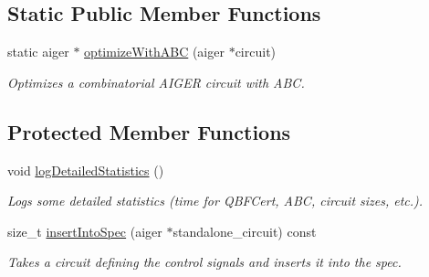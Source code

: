 \subsection*{Static Public Member Functions}
\begin{DoxyCompactItemize}
\item 
static aiger $\ast$ \hyperlink{classCNFImplExtractor_ad21828d816dfdbf672f6e595589ef6e7}{optimize\-With\-A\-B\-C} (aiger $\ast$circuit)
\begin{DoxyCompactList}\small\item\em Optimizes a combinatorial A\-I\-G\-E\-R circuit with A\-B\-C. \end{DoxyCompactList}\end{DoxyCompactItemize}
\subsection*{Protected Member Functions}
\begin{DoxyCompactItemize}
\item 
void \hyperlink{classQBFCertImplExtractor_aa6a292ba4108e707f458c04d621a6d9e}{log\-Detailed\-Statistics} ()
\begin{DoxyCompactList}\small\item\em Logs some detailed statistics (time for Q\-B\-F\-Cert, A\-B\-C, circuit sizes, etc.). \end{DoxyCompactList}\item 
size\-\_\-t \hyperlink{classCNFImplExtractor_a0970602635f3356712d57ebb28d12c0d}{insert\-Into\-Spec} (aiger $\ast$standalone\-\_\-circuit) const 
\begin{DoxyCompactList}\small\item\em Takes a circuit defining the control signals and inserts it into the spec. \end{DoxyCompactList}\end{DoxyCompactItemize}
